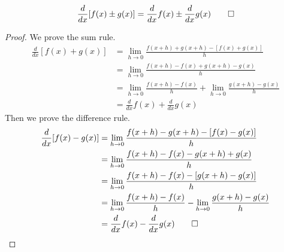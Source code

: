 \begin{theorem}
    \[\frac{d}{dx}[f(x)\pm g(x)]
    =\frac{d}{dx}f(x)\pm \frac{d}{dx}g(x)\qedhere\]
\end{theorem}
\begin{proof}
    We prove the sum rule.
    \begin{align*}
        \frac{d}{dx}[f(x)+g(x)]
        &= \lim_{h\to 0}\frac{f(x+h)+g(x+h)-[f(x)+g(x)]}{h} \\
        &= \lim_{h\to 0}\frac{f(x+h)-f(x)+g(x+h)-g(x)}{h} \\
        &= \lim_{h\to 0}\frac{f(x+h)-f(x)}{h}
        +\lim_{h\to 0}\frac{g(x+h)-g(x)}{h} \\
        &= \frac{d}{dx}f(x)+\frac{d}{dx}g(x)
    \end{align*}
    Then we prove the difference rule.
    \begin{align*}
        \frac{d}{dx}[f(x)-g(x)]
        &= \lim_{h\to 0}\frac{f(x+h)-g(x+h)-[f(x)-g(x)]}{h} \\
        &= \lim_{h\to 0}\frac{f(x+h)-f(x)-g(x+h)+g(x)}{h} \\
        &= \lim_{h\to 0}\frac{f(x+h)-f(x)-[g(x+h)-g(x)]}{h} \\
        &= \lim_{h\to 0}\frac{f(x+h)-f(x)}{h}
        -\lim_{h\to 0}\frac{g(x+h)-g(x)}{h} \\
        &= \frac{d}{dx}f(x)-\frac{d}{dx}g(x)\qedhere
    \end{align*}
\end{proof}

